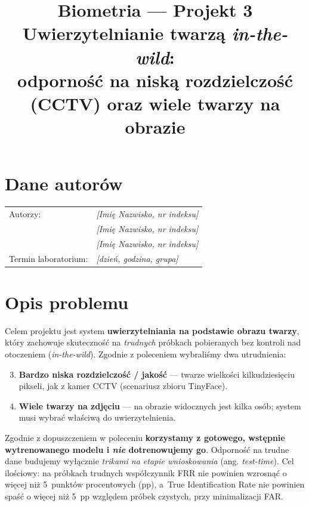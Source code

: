 \documentclass[11pt,a4paper]{article}
\title{\textbf{Biometria --- Projekt 3}\\[2mm]
\large Uwierzytelnianie twarzą \emph{in-the-wild}:\\
odporność na niską rozdzielczość (CCTV) oraz wiele twarzy na obrazie}
\author{}
\date{}
\begin{document}
\maketitle

\section*{Dane autorów}
\begin{tabular}{ll}
Autorzy: & \emph{[Imię Nazwisko, nr indeksu]} \\
         & \emph{[Imię Nazwisko, nr indeksu]} \\
         & \emph{[Imię Nazwisko, nr indeksu]} \\
Termin laboratorium: & \emph{[dzień, godzina, grupa]} \\
\end{tabular}

\section{Opis problemu}

Celem projektu jest system \textbf{uwierzytelniania na podstawie obrazu twarzy},
który zachowuje skuteczność na \emph{trudnych} próbkach pobieranych bez kontroli nad
otoczeniem (\emph{in-the-wild}). Zgodnie z poleceniem wybraliśmy dwa utrudnienia:

\begin{enumerate}[label=\textbf{\#\arabic*}]
\setcounter{enumi}{2}
\item[\textbf{\#3}] \textbf{Bardzo niska rozdzielczość / jakość} --- twarze wielkości
kilkudziesięciu pikseli, jak z kamer CCTV (scenariusz zbioru TinyFace).
\item[\textbf{\#1}] \textbf{Wiele twarzy na zdjęciu} --- na obrazie widocznych jest kilka
osób; system musi wybrać właściwą do uwierzytelnienia.
\end{enumerate}

Zgodnie z dopuszczeniem w poleceniu \textbf{korzystamy z gotowego, wstępnie wytrenowanego
modelu i \emph{nie} dotrenowujemy go}. Odporność na trudne dane budujemy wyłącznie
\emph{trikami na etapie wnioskowania} (ang. \emph{test-time}). Cel ilościowy: na próbkach
trudnych współczynnik FRR nie powinien wzrosnąć o więcej niż 5~punktów procentowych (pp),
a~True Identification Rate nie powinien spaść o więcej niż 5~pp względem próbek czystych,
przy minimalizacji FAR.
\end{document}

